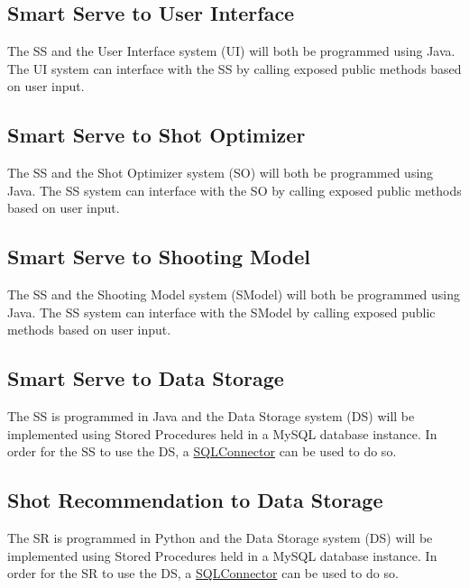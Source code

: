 \documentclass[11pt]{article}
\begin{document}
\subsection{Smart Serve to User Interface}
The SS and the User Interface system (UI) will both be programmed using Java. The UI system can interface with the SS by calling exposed public methods based on user input.
\subsection{Smart Serve to Shot Optimizer}
The SS and the Shot Optimizer system (SO) will both be programmed using Java. The SS system can interface with the SO by calling exposed public methods based on user input.
\subsection{Smart Serve to Shooting Model}
The SS and the Shooting Model system (SModel) will both be programmed using Java. The SS system can interface with the SModel by calling exposed public methods based on user input.
\subsection{Smart Serve to Data Storage}
The SS is programmed in Java and the Data Storage system (DS) will be implemented using Stored Procedures held in a MySQL database instance. In order for the SS to use the DS, a \href{https://dev.mysql.com/downloads/connector/j/5.1.html}{SQLConnector} can be used to do so.
\subsection{Shot Recommendation to Data Storage}
The SR is programmed in Python and the Data Storage system (DS) will be implemented using Stored Procedures held in a MySQL database instance. In order for the SR to use the DS, a \href{https://dev.mysql.com/doc/connector-python/en/}{SQLConnector} can be used to do so.
\end{document}
